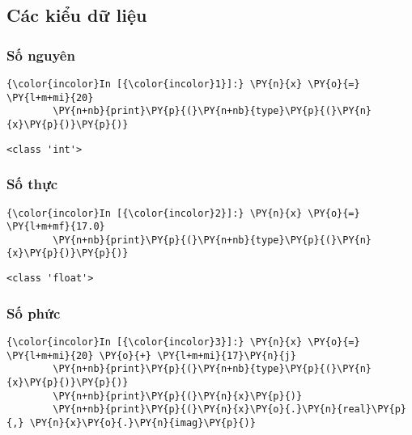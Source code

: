 



    
    \subsection{Các kiểu dữ liệu}\label{cuxe1c-kiux1ec3u-dux1eef-liux1ec7u}

    \subsubsection{Số nguyên}\label{sux1ed1-nguyuxean}

    
\begin{Verbatim}[commandchars=\\\{\}]
{\color{incolor}In [{\color{incolor}1}]:} \PY{n}{x} \PY{o}{=} \PY{l+m+mi}{20}
        \PY{n+nb}{print}\PY{p}{(}\PY{n+nb}{type}\PY{p}{(}\PY{n}{x}\PY{p}{)}\PY{p}{)}
\end{Verbatim}
    

    \begin{Verbatim}[commandchars=\\\{\}]
<class 'int'>

    \end{Verbatim}

    \subsubsection{Số thực}\label{sux1ed1-thux1ef1c}

    
\begin{Verbatim}[commandchars=\\\{\}]
{\color{incolor}In [{\color{incolor}2}]:} \PY{n}{x} \PY{o}{=} \PY{l+m+mf}{17.0}
        \PY{n+nb}{print}\PY{p}{(}\PY{n+nb}{type}\PY{p}{(}\PY{n}{x}\PY{p}{)}\PY{p}{)}
\end{Verbatim}
    

    \begin{Verbatim}[commandchars=\\\{\}]
<class 'float'>

    \end{Verbatim}

    \subsubsection{Số phức}\label{sux1ed1-phux1ee9c}

    
\begin{Verbatim}[commandchars=\\\{\}]
{\color{incolor}In [{\color{incolor}3}]:} \PY{n}{x} \PY{o}{=} \PY{l+m+mi}{20} \PY{o}{+} \PY{l+m+mi}{17}\PY{n}{j}
        \PY{n+nb}{print}\PY{p}{(}\PY{n+nb}{type}\PY{p}{(}\PY{n}{x}\PY{p}{)}\PY{p}{)}
        \PY{n+nb}{print}\PY{p}{(}\PY{n}{x}\PY{p}{)}
        \PY{n+nb}{print}\PY{p}{(}\PY{n}{x}\PY{o}{.}\PY{n}{real}\PY{p}{,} \PY{n}{x}\PY{o}{.}\PY{n}{imag}\PY{p}{)}
\end{Verbatim}
    


